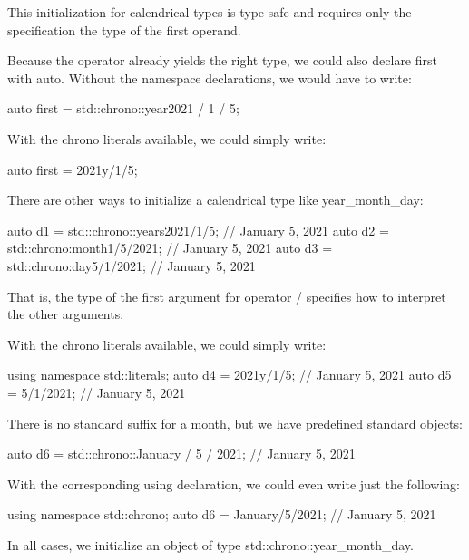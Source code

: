 This initialization for calendrical types is type-safe and requires only the specification the type of the first operand.

Because the operator already yields the right type, we could also declare first with auto. Without the namespace declarations, we would have to write:

\begin{cpp}
auto first = std::chrono::year{2021} / 1 / 5;
\end{cpp}

With the chrono literals available, we could simply write:

\begin{cpp}
auto first = 2021y/1/5;
\end{cpp}


There are other ways to initialize a calendrical type like year\_month\_day:

\begin{cpp}
auto d1 = std::chrono::years{2021}/1/5; // January 5, 2021
auto d2 = std::chrono:month{1}/5/2021; // January 5, 2021
auto d3 = std::chrono:day{5}/1/2021; // January 5, 2021
\end{cpp}

That is, the type of the first argument for operator / specifies how to interpret the other arguments.

With the chrono literals available, we could simply write:

\begin{cpp}
using namespace std::literals;
auto d4 = 2021y/1/5; // January 5, 2021
auto d5 = 5/1/2021; // January 5, 2021
\end{cpp}

There is no standard suffix for a month, but we have predefined standard objects:

\begin{cpp}
auto d6 = std::chrono::January / 5 / 2021; // January 5, 2021
\end{cpp}

With the corresponding using declaration, we could even write just the following:

\begin{cpp}
using namespace std::chrono;
auto d6 = January/5/2021; // January 5, 2021
\end{cpp}

In all cases, we initialize an object of type std::chrono::year\_month\_day.

